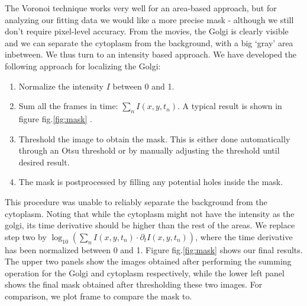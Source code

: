 \documentclass[12pt,a4paper,]{Dissertate}
\providecommand{\tightlist}{%
  \setlength{\itemsep}{0pt}\setlength{\parskip}{0pt}}
\begin{document}
The Voronoi technique works very well for an area-based approach, but
for analyzing our fitting data we would like a more precise mask -
although we still don't require pixel-level accuracy. From the movies,
the Golgi is clearly visible and we can separate the cytoplasm from the
background, with a big `gray' area inbetween. We thus turn to an
intensity based approach. We have developed the following approach for
localizing the Golgi:

\begin{enumerate}
\def\labelenumi{\arabic{enumi}.}
\tightlist
\item
  Normalize the intensity \(I\) between 0 and 1.
\item
  Sum all the frames in time: \(\sum_n I(x, y, t_n)\). A typical result
  is shown in figure fig.\ref{fig:mask} .
\item
  Threshold the image to obtain the mask. This is either done
  automatically through an Otsu threshold or by manually adjusting the
  threshold until desired result.
\item
  The mask is postprocessed by filling any potential holes inside the
  mask.
\end{enumerate}

This procedure was unable to reliably separate the background from the
cytoplasm. Noting that while the cytoplasm might not have the intensity
as the golgi, its time derivative should be higher than the rest of the
areas. We replace step two by
\(\log_{10}\left(\sum_nI(x,y,t_n)\cdot\partial_tI(x,y,t_n)\right)\),
where the time derivative has been normalized between 0 and 1. Figure
fig.\ref{fig:mask} shows our final results. The upper two panels show
the images obtained after performing the summing operation for the Golgi
and cytoplasm respectively, while the lower left panel shows the final
mask obtained after thresholding these two images. For comparison, we
plot frame to compare the mask to.
\end{document}
